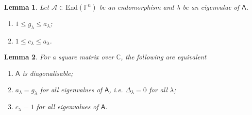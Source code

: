 \documentclass{article}
\theoremstyle{plain}\theoremheaderfont{\normalfont\itshape}\theorembodyfont{\rmfamily}\theoremseparator{.}\newtheorem*{rem}{Remark}\newtheorem*{ex}{Example}\newtheorem*{proof}{Proof}\newtheorem*{altp}{Alternative proof}
\theoremstyle{plain}\theoremheaderfont{\normalfont\bfseries}\theorembodyfont{\rmfamily}\theoremseparator{.}\newtheorem{thm}{Theorem}[section]\newtheorem{lem}[thm]{Lemma}\newtheorem{prop}[thm]{Proposition}\newtheorem*{cor}{Corollary}\newtheorem{defn}[thm]{Definition}\newtheorem{clm}[thm]{Claim}\newtheorem{clminproof}{Claim}
\theoremstyle{break}\theoremheaderfont{\normalfont\itshape}\theorembodyfont{\rmfamily}\theoremseparator{.\medskip}\newtheorem*{proofskip}{Proof}\newtheorem*{exs}{Examples}\newtheorem*{rems}{Remarks}
\theoremstyle{break}\theoremheaderfont{\normalfont\bfseries}\theorembodyfont{\rmfamily}\theoremseparator{.\medskip}\newtheorem{lemskip}[thm]{Lemma}\newtheorem{defnskip}[thm]{Definition}\newtheorem{propskip}[thm]{Proposition}\newtheorem{thmskip}[thm]{Theorem}
\numberwithin{equation}{section}
\begin{document}
	\begin{lem}
		Let \(\mathcal{A}\in\mathrm{End}(\mathbb{F}^n)\) be an endomorphism and \(\lambda\) be an eigenvalue of \(\mathsf{A}\).
		\begin{enumerate}[topsep=0pt]
			\item \(1\le g_\lambda\le a_\lambda\);
			\item \(1\le c_\lambda\le a_\lambda\).
		\end{enumerate}
	\end{lem}
	\begin{lem}
		For a square matrix over \(\mathbb{C}\), the following are equivalent
		\begin{enumerate}[topsep=0pt]
			\item \(\mathsf{A}\) is diagonalisable;
			\item \(a_\lambda= g_\lambda\) for all eigenvalues of \(\mathsf{A}\), i.e. \(\Delta_\lambda=0\) for all \(\lambda\);
			\item \(c_\lambda=1\) for all eigenvalues of \(\mathsf{A}\).
		\end{enumerate}
	\end{lem}
\end{document}
